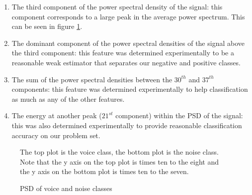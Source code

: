 \documentclass[ %
                    author={Sam Phippen},
                supervisor={Dr. Rafal Bogacz},
                     title={Real time voice activity detectors in noisy personal computing environments},
                  subtitle={},
                    degree={MEng},
                      year={2012} ]{thesis}
\begin{document}
\begin{enumerate}
    \item The third component of the power spectral density of the signal: this
        component corresponds to a large peak in the average power spectrum.
        This can be seen in figure \ref{fig:psd}.

    \item The dominant component of the power spectral densities of the signal
        above the third component: this feature was determined experimentally
        to be a reasonable weak estimator that separates our negative and
        positive classes.

    \item The sum of the power spectral densities between the $30^{th}$ and $37^{th}$
        components: this feature was determined experimentally to help
        classification as much as any of the other features.

    \item The energy at another peak ($21^{st}$ component) within the PSD of the
        signal: this was also determined experimentally to provide reasonable
        classification accuracy on our problem set.

\end{enumerate}

\begin{figure}

    \caption{PSD of voice and noise classes}

    The top plot is the voice class, the bottom plot is the noise class. Note
    that the y axis on the top plot is times ten to the eight and the y axis on
    the bottom plot is times ten to the seven.


    \label{fig:psd}

\end{figure}
\end{document}
